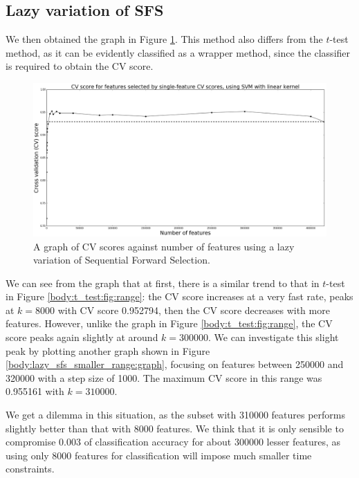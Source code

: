 \documentclass[12pt, twoside, a4paper]{report}
\begin{document}
\subsection{Lazy variation of SFS}
We then obtained the graph in Figure \ref{body:lazy_sfs:graph}. This method also differs from the $t$-test method, as it can be evidently classified as a wrapper method, since the classifier is required to obtain the CV score.

\begin{figure}
\centering
\includegraphics[width=\textwidth]{images/lazy_sfs_range.jpeg}
\caption{A graph of CV scores against number of features using a lazy variation of Sequential Forward Selection.}
\label{body:lazy_sfs:graph}
\end{figure}

We can see from the graph that at first, there is a similar trend to that in $t$-test in Figure \ref{body:t_test:fig:range}: the CV score increases at a very fast rate, peaks at $k=8000$ with CV score 0.952794, then the CV score decreases with more features. However, unlike the graph in Figure \ref{body:t_test:fig:range}, the CV score peaks again slightly at around $k=300000$. We can investigate this slight peak by plotting another graph shown in Figure \ref{body:lazy_sfs_smaller_range:graph}, focusing on features between 250000 and 320000 with a step size of 1000. The maximum CV score in this range was 0.955161 with $k=310000$.

We get a dilemma in this situation, as the subset with 310000 features performs slightly better than that with 8000 features. We think that it is only sensible to compromise 0.003 of classification accuracy for about 300000 lesser features, as using only 8000 features for classification will impose much smaller time constraints.
\end{document}
